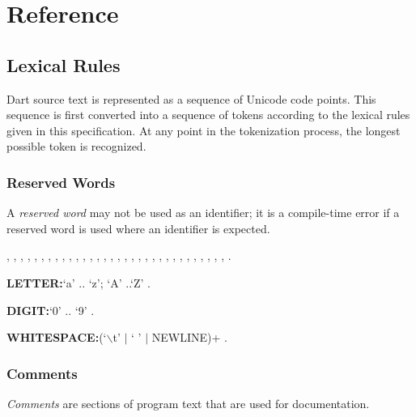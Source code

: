 \documentclass{article}
\begin{document}


\section{Reference}


\subsection{Lexical Rules}

\LMHash{}
Dart source text is represented as a sequence of Unicode code points.
This sequence is first converted into a sequence of tokens according to the lexical rules given in this specification.
At any point in the tokenization process, the longest possible token is recognized.


\subsubsection{Reserved Words}

\LMHash{}
A {\em reserved word} may not be used as an identifier; it is a compile-time error if a reserved word is used where an identifier is expected.

\ASSERT{}, \BREAK{}, \CASE{}, \CATCH{}, \CLASS{}, \CONST{}, \CONTINUE{}, \DEFAULT{}, \DO{}, \ELSE{}, \ENUM{}, \EXTENDS{}, \FALSE{}, \FINAL{}, \FINALLY{}, \FOR{}, \IF{}, \IN{}, \IS{}, \NEW{}, \NULL{}, \RETHROW, \RETURN{}, \SUPER{}, \SWITCH{}, \THIS{}, \THROW{}, \TRUE{}, \TRY{}, \VAR{}, \VOID{}, \WHILE{}, \WITH{}.

\begin{grammar}
{\bf LETTER:}`a' {\escapegrammar ..} `z';
  `A' {\escapegrammar ..}`Z'
  .

{\bf DIGIT:}`0' {\escapegrammar ..} `9'
  .

{\bf WHITESPACE:}(`$\backslash$t' $|$ ` ' $|$ NEWLINE)+
  .
\end{grammar}


\subsubsection{Comments}

\LMHash{}
{\em Comments} are sections of program text that are used for documentation.
\end{document}
